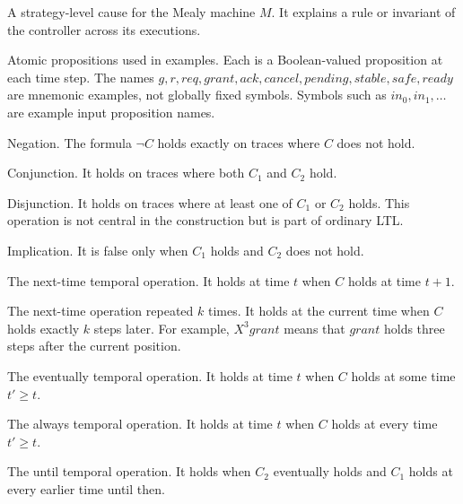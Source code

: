 \documentclass[11pt]{article}
\theoremstyle{remark}
\begin{document}
\begin{description}[leftmargin=2.8cm,style=nextline]
  \item[\(C_M\)]
  A strategy-level cause for the Mealy machine \(M\). It explains a rule or
  invariant of the controller across its executions.

  \item[\(p,a,b,g,r,req,grant,ack,cancel,pending,stable,safe,ready\)]
  Atomic propositions used in examples. Each is a Boolean-valued proposition at
  each time step. The names \(g,r,req,grant,ack,cancel,pending,stable,safe,ready\)
  are mnemonic examples, not globally fixed symbols. Symbols such as
  \(in_0,in_1,\ldots\) are example input proposition names.

  \item[\(\neg C\)]
  Negation. The formula \(\neg C\) holds exactly on traces where \(C\) does not
  hold.

  \item[\(C_1\land C_2\)]
  Conjunction. It holds on traces where both \(C_1\) and \(C_2\) hold.

  \item[\(C_1\lor C_2\)]
  Disjunction. It holds on traces where at least one of \(C_1\) or \(C_2\)
  holds. This operation is not central in the construction but is part of
  ordinary LTL.

  \item[\(C_1\rightarrow C_2\)]
  Implication. It is false only when \(C_1\) holds and \(C_2\) does not hold.

  \item[\(X C\)]
  The next-time temporal operation. It holds at time \(t\) when \(C\) holds at
  time \(t+1\).

  \item[\(X^k C\)]
  The next-time operation repeated \(k\) times. It holds at the current time
  when \(C\) holds exactly \(k\) steps later. For example, \(X^3 grant\) means
  that \(grant\) holds three steps after the current position.

  \item[\(F C\)]
  The eventually temporal operation. It holds at time \(t\) when \(C\) holds at
  some time \(t'\geq t\).

  \item[\(G C\)]
  The always temporal operation. It holds at time \(t\) when \(C\) holds at
  every time \(t'\geq t\).

  \item[\(C_1\,U\,C_2\)]
  The until temporal operation. It holds when \(C_2\) eventually holds and
  \(C_1\) holds at every earlier time until then.


\end{description}
\end{document}
